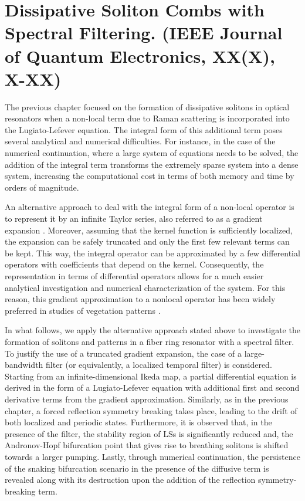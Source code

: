 \chapter{Dissipative Soliton Combs with Spectral Filtering. (IEEE Journal of Quantum Electronics, XX(X), X-XX)}

The previous chapter focused on the formation of dissipative solitons in optical
resonators when a non-local term due to Raman scattering is incorporated into the Lugiato-Lefever equation. The
integral form of this additional term poses several analytical and numerical difficulties.
For instance, in the case of the numerical continuation, where a
large system of equations needs to be solved, the addition of the integral term transforms the extremely sparse
system into a dense system, increasing the computational cost in terms of both memory and time
by orders of magnitude.

An alternative approach to deal with the integral form of a non-local operator is to represent
it by an infinite Taylor series, also referred to as a gradient expansion \cite{murray2003mathematical}. Moreover, 
assuming that the kernel function is sufficiently localized, the expansion can be
safely truncated and only the first few relevant terms can be kept. This way, the integral operator can be
approximated by a few differential operators with coefficients that depend on
the kernel. Consequently, the representation in terms of differential operators
allows for a much easier analytical investigation and numerical characterization of the system.
For this reason, this gradient approximation to a nonlocal operator has been widely 
preferred in studies of vegetation patterns \cite{lefever1997origin,clerc2021localised,pinto2022vegetation,pinto2023topological}.

In what follows, we apply the alternative approach stated above to investigate
the formation of solitons and patterns in a fiber ring resonator with a spectral filter.
To justify the use of a truncated gradient expansion, the case of a large-bandwidth filter
(or equivalently, a localized temporal filter) is considered. Starting from an infinite-dimensional
Ikeda map, a partial differential equation is derived in the form of a Lugiato-Lefever equation with additional
first and second derivative terms from the gradient approximation. Similarly, as in the previous chapter,
a forced reflection symmetry breaking takes place, leading to the drift of both localized and periodic states.
Furthermore, it is observed that, in the presence of the filter, the stability region of LSs is significantly reduced
and, the Andronov-Hopf bifurcation point that gives rise to breathing solitons is shifted towards a larger pumping.
Lastly, through numerical continuation, the persistence of the snaking bifurcation scenario in
the presence of the diffusive term is revealed along with its destruction upon the addition of the reflection symmetry-breaking term.

